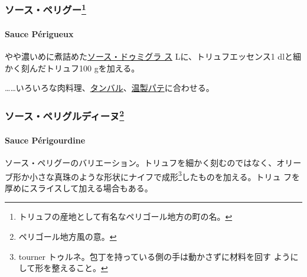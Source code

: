 \begin{recette}
\maeaki

\hypertarget{ux30bdux30fcux30b9ux30daux30eaux30b0ux30fc59}{%
\subsubsection[ソース・ペリグー]{\texorpdfstring{ソース・ペリグー\footnote{トリュフの産地として有名なペリゴール地方の町の名。}}{ソース・ペリグー}}\label{ux30bdux30fcux30b9ux30daux30eaux30b0ux30fc59}}

\hypertarget{sauce-perigueux}{%
\paragraph{Sauce Périgueux}\label{sauce-perigueux}}

  

やや濃いめに煮詰めた\protect\hyperlink{sauce-demi-glace}{ソース・ドゥミグラ
ス}\troisquarts{} Lに、トリュフエッセンス1 \undemi{}
dlと細かく刻んだトリュフ100 gを加える。

\ldots{}\ldots{}いろいろな肉料理、\href{}{タンバル}、\href{}{温製パテ}に合わせる。

\maeaki

\hypertarget{ux30bdux30fcux30b9ux30daux30eaux30b0ux30ebux30c7ux30a3ux30fcux30cc60}{%
\subsubsection[ソース・ペリグルディーヌ]{\texorpdfstring{ソース・ペリグルディーヌ\footnote{ペリゴール地方風の意。}}{ソース・ペリグルディーヌ}}\label{ux30bdux30fcux30b9ux30daux30eaux30b0ux30ebux30c7ux30a3ux30fcux30cc60}}

\hypertarget{sauce-puxe9rigourdine}{%
\paragraph{Sauce Périgourdine}\label{sauce-puxe9rigourdine}}


ソース・ペリグーのバリエーション。トリュフを細かく刻むのではなく、オリー
ブ形か小さな真珠のような形状にナイフで成形\footnote{tourner
  トゥルネ。包丁を持っている側の手は動かさずに材料を回す
  ようにして形を整えること。}したものを加える。トリュ
フを厚めにスライスして加える場合もある。


\end{recette}
